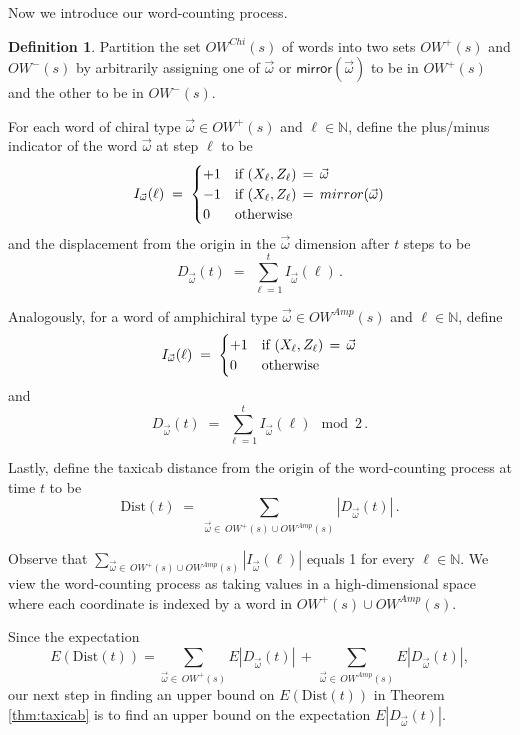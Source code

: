 \documentclass[12pt]{amsart}
\theoremstyle{definition}
\newtheorem{definition}[theorem]{Definition}
\theoremstyle{remark}
\numberwithin{equation}{section}
\newcommand{\mirror}{\textsf{mirror}}
\begin{document}
Now we introduce our word-counting process.


\begin{definition}
\label{def:indicator}
Partition the set $OW^{Chi}(s)$ of words  into 
two sets $OW^{+}(s)$ and $OW^{-}(s)$ by arbitrarily assigning one of $\vec{\omega}$ or $\mirror(\vec{\omega})$ to be in $OW^{+}(s)$ and the other to be in $OW^{-}(s)$.

For each word of chiral type $\vec{\omega}\in OW^{+}(s)$ and $\ell\in \mathbb{N}$, define the plus/minus indicator of
the word $\vec{\omega}$ at step $\ell$ to be 
\[     I_{\vec{\omega}}(\ell)  \; = \; \begin{cases}   +1 & \hbox{if }(X_{\ell},Z_\ell) \,=\, \vec{\omega}  \\   -1 & \hbox{if }(X_{\ell},Z_\ell) \,=\, \mirror(\vec{\omega})  
      \\   0 & \hbox{otherwise}    \end{cases}
\]  
and the displacement from the origin in the $\vec{\omega}$ dimension after $t$ steps to be
\[  D_{\vec{\omega}}(t) \;=\;  \sum_{\ell=1}^t I_{\vec{\omega}}(\ell) \,.
\]

Analogously, for a word of amphichiral type $\vec{\omega}\in OW^{Amp}(s)$ and $\ell\in \mathbb{N}$, define 
\[     I_{\vec{\omega}}(\ell)  \; = \; \begin{cases}   +1 & \hbox{if }(X_{\ell},Z_\ell) \,=\, \vec{\omega} 
      \\   0 & \hbox{otherwise}    \end{cases}
\]  
and 
\[  D_{\vec{\omega}}(t) \;=\;  \sum_{\ell=1}^t I_{\vec{\omega}}(\ell) 
  \mod 2\,.
\]

Lastly, define the taxicab distance from the origin of the word-counting process at time $t$ to be 
\begin{equation}  
 \label{eq.defDist}
 \text{Dist}(t)   \;=\;  \sum_{\vec{\omega}\in\, OW^{+}(s)\cup OW^{Amp}(s)}|D_{\vec{\omega}}(t)| \,.
\end{equation}
\end{definition}


Observe that $\sum_{\vec{\omega}\in\, OW^{+}(s)\cup OW^{Amp}(s)}|I_{\vec{\omega}}(\ell)|$ equals 1 for every $\ell\in \mathbb{N}$.  
We view the word-counting process
as taking values in a high-dimensional space where each coordinate is indexed by a word in $OW^{+}(s)\cup OW^{Amp}(s)$.


Since the expectation
\[  E(\text{Dist}(t))  =  \sum_{\vec{\omega}\in \,OW^{+}(s)}E|D_{\vec{\omega}}(t)| 
  \,+\,\sum_{\vec{\omega}\in \, OW^{Amp}(s)}E|D_{\vec{\omega}}(t)|, 
\]
our next step in finding an upper bound on $E(\text{Dist}(t))$ in Theorem \ref{thm:taxicab} is to find an upper bound on the expectation $E|D_{\vec{\omega}}(t)|$.
\end{document}
